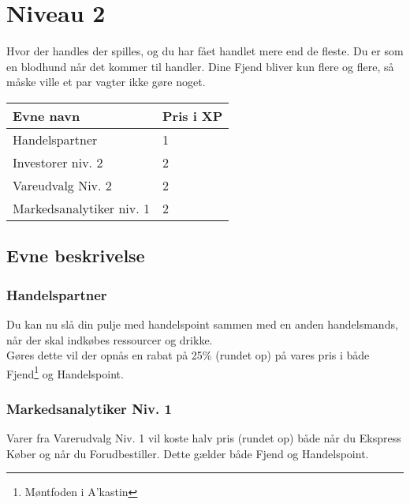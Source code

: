 \chapter{Niveau 2}
Hvor der handles der spilles, og du har fået handlet mere end de fleste. Du er som en blodhund når det kommer til handler. Dine Fjend bliver kun flere og flere, så måske ville et par vagter ikke gøre noget.

\begin{table}[H]
    \centering
    \begin{tabular}{|p{}|p{}|}
    \rowcolor{cerulean!80}\hline
        Evne navn & Pris i XP \\\hline
         Handelspartner & 1 \\\hline
         Investorer niv. 2 & 2 \\\hline
         Vareudvalg Niv. 2 & 2 \\\hline
         Markedsanalytiker niv. 1& 2\\\hline
    \end{tabular}
\end{table}
\section{Evne beskrivelse}

\subsection{Handelspartner}
Du kan nu slå din pulje med handelspoint sammen med en anden handelsmands, når der skal indkøbes ressourcer og drikke.\\
Gøres dette vil der opnås en rabat på 25\% (rundet op) på vares pris i både Fjend\footnote{Møntfoden i A'kastin} og Handelspoint.

\subsection{Markedsanalytiker Niv. 1}
Varer fra Varerudvalg Niv. 1 vil koste halv pris (rundet op) både når du Ekspress Køber og når du Forudbestiller. Dette gælder både Fjend og Handelspoint.\\




